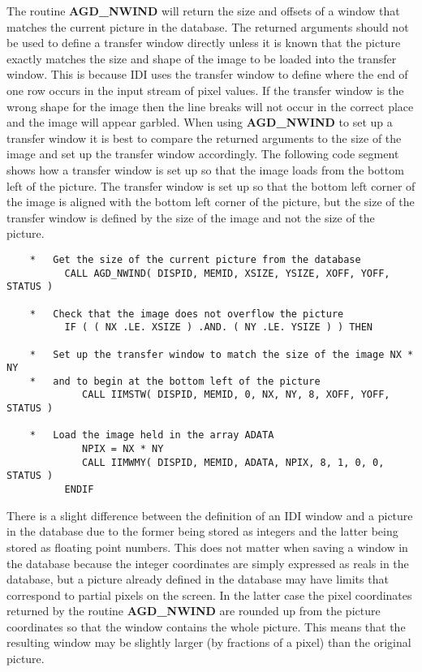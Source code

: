 The routine {\bf AGD\_NWIND} will return the size and offsets of a window that
matches the current picture in the database. The returned arguments should
not be used to define a transfer window directly unless it is known that
the picture exactly matches the size and shape of the image to be loaded
into the transfer window. This is because IDI uses the transfer window to
define where the end of one row occurs in the input stream of pixel values.
If the transfer window is the wrong shape for the image then the line
breaks will not occur in the correct place and the image will appear
garbled. When using {\bf AGD\_NWIND} to set up a transfer window it is best
to compare the returned arguments to the size of the image and set up the
transfer window accordingly. The following code segment shows how a
transfer window is set up so that the image loads from the bottom left of
the picture. The transfer window is set up so that the bottom left corner
of the image is aligned with the bottom left corner of the picture, but the
size of the transfer window is defined by the size of the image and not the
size of the picture.
\begin{verbatim}
    *   Get the size of the current picture from the database
          CALL AGD_NWIND( DISPID, MEMID, XSIZE, YSIZE, XOFF, YOFF, STATUS )

    *   Check that the image does not overflow the picture
          IF ( ( NX .LE. XSIZE ) .AND. ( NY .LE. YSIZE ) ) THEN

    *   Set up the transfer window to match the size of the image NX * NY
    *   and to begin at the bottom left of the picture
             CALL IIMSTW( DISPID, MEMID, 0, NX, NY, 8, XOFF, YOFF, STATUS )

    *   Load the image held in the array ADATA
             NPIX = NX * NY
             CALL IIMWMY( DISPID, MEMID, ADATA, NPIX, 8, 1, 0, 0, STATUS )
          ENDIF
\end{verbatim}
There is a slight difference between the definition of an IDI window and
a picture in the database due to the former being stored as integers and
the latter being stored as floating point numbers. This does not matter
when saving a window in the database because the integer coordinates are
simply expressed as reals in the database, but a picture already defined in
the database may have limits that correspond to partial pixels on the screen.
In the latter case the pixel coordinates returned by the routine
{\bf AGD\_NWIND} are rounded up from the picture coordinates so that the
window contains the whole picture. This means that the resulting window
may be slightly larger (by fractions of a pixel) than the original picture.


